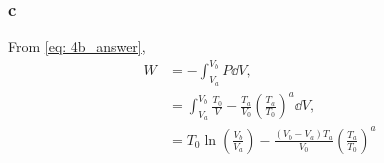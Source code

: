 \documentclass[a4paper,12pt,twoside]{article}
\begin{document}
\begin{multicols*}{2}
\subsubsection*{c}
From \ref{eq: 4b_answer},
\begin{align}
	W &= -\int_{V_a}^{V_b} P \dd{V},\\
	&= \int_{V_a}^{V_b} \frac{T_0}{V} - \frac{T_a}{V_0}\left( \frac{T_a}{T_0} \right)^a \dd{V},\\
	&= T_0\ln(\frac{V_b}{V_a}) - \frac{(V_b-V_a)T_a}{V_0}\left( \frac{T_a}{T_0} \right)^a
\end{align}

\nocite{*}
\printbibliography[title={References},heading=bibnumbered]


\end{multicols*}
\end{document}
